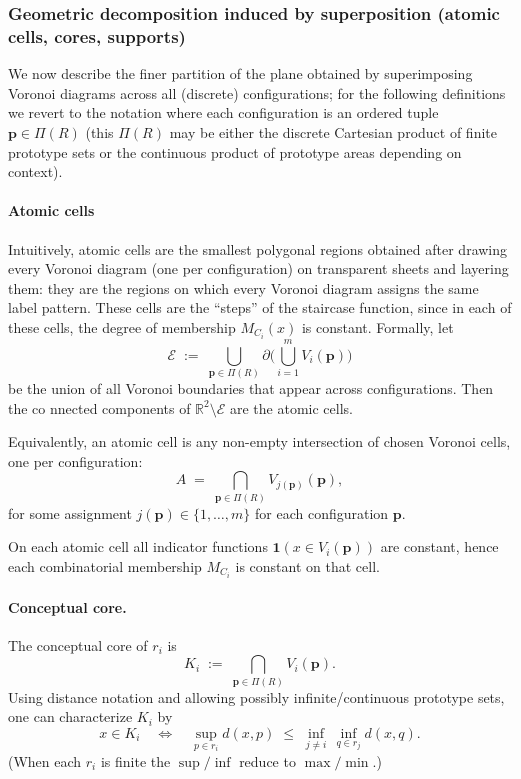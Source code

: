 \documentclass{article}
\begin{document}
\subsubsection*{Geometric decomposition induced by superposition (atomic cells, cores, supports)}
We now describe the finer partition of the plane obtained by superimposing Voronoi diagrams across all (discrete) configurations; for the following definitions we revert to the notation where each configuration is an ordered tuple \(\mathbf p\in\Pi(R)\) (this \(\Pi(R)\) may be either the discrete Cartesian product of finite prototype sets or the continuous product of prototype areas depending on context).

\paragraph{Atomic cells} Intuitively, atomic cells are the smallest polygonal regions obtained after drawing every Voronoi diagram (one per configuration) on transparent sheets and layering them: they are the regions on which every Voronoi diagram assigns the same label pattern. These cells are the “steps” of the staircase function, since in each of these cells, the degree of membership $M_{C_i}(x)$ is constant. Formally, let
\[
\mathcal{E} \;:=\; \bigcup_{\mathbf p\in\Pi(R)} \partial\!\Big(\bigcup_{i=1}^m V_i(\mathbf p)\Big)
\]
be the union of all Voronoi boundaries that appear across configurations. Then the co   nnected components of \(\mathbb{R}^2\setminus\mathcal{E}\) are the atomic cells. 


Equivalently, an atomic cell is any non-empty intersection of chosen Voronoi cells, one per configuration:
\[
A \;=\; \bigcap_{\mathbf p\in\Pi(R)} V_{j(\mathbf p)}(\mathbf p),
\]
for some assignment \(j(\mathbf p)\in\{1,\dots,m\}\) for each configuration \(\mathbf p\).

On each atomic cell all indicator functions \(\mathbf{1}(x\in V_i(\mathbf p))\) are constant, hence each combinatorial membership \(M_{C_i}\) is constant on that cell.

\paragraph{Conceptual core.} The conceptual core of \(r_i\) is
\[
K_i \;:=\; \bigcap_{\mathbf p\in\Pi(R)} V_i(\mathbf p).
\]
Using distance notation and allowing possibly infinite/continuous prototype sets, one can characterize \(K_i\) by
\[
x\in K_i \quad\Longleftrightarrow\quad
\sup_{p\in r_i} d(x,p)\;\le\;\inf_{j\ne i}\,\inf_{q\in r_j} d(x,q).
\]
(When each \(r_i\) is finite the \(\sup/\inf\) reduce to \(\max/\min\).)
\end{document}
